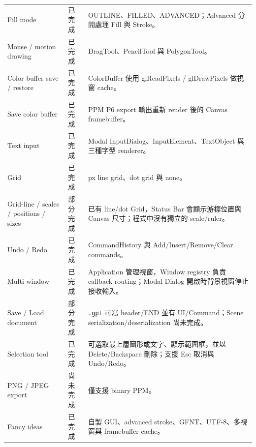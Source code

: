 \begin{longtable}{>{\raggedright\arraybackslash}p{} >{\raggedright\arraybackslash}p{} >{\raggedright\arraybackslash}p{}}
    Fill mode                              & 已完成    & OUTLINE、FILLED、ADVANCED；Advanced 分開處理 Fill 與 Stroke。                                   \\
    Mouse / motion drawing                 & 已完成    & DragTool、PencilTool 與 PolygonTool。                                                     \\
    Color buffer save / restore            & 已完成    & ColorBuffer 使用 glReadPixels / glDrawPixels 做視窗 cache。                                  \\
    Save color buffer                      & 已完成    & PPM P6 export 輸出重新 render 後的 Canvas framebuffer。                                       \\
    Text input                             & 已完成    & Modal InputDialog、InputElement、TextObject 與三種字型 renderer。                              \\
    Grid                                   & 已完成    & 25 px line grid、dot grid 與 none。                                                       \\
    Grid-line / scales / positions / sizes & 部分完成   & 已有 line/dot Grid，Status Bar 會顯示游標位置與 Canvas 尺寸；程式中沒有獨立的 scale/ruler。                   \\
    Undo / Redo                            & 已完成    & CommandHistory 與 Add/Insert/Remove/Clear commands。                                     \\
    Multi-window                           & 已完成    & Application 管理視窗，Window registry 負責 callback routing；Modal Dialog 開啟時背景視窗停止接收輸入。       \\
    Save / Load document                   & 部分完成   & \lstinline|.gpt| 可寫 header/END 並有 UI/Command；Scene serialization/deserialization 尚未完成。 \\
    Selection tool                         & 已完成    & 可選取最上層圖形或文字、顯示範圍框，並以 Delete/Backspace 刪除；支援 Esc 取消與 Undo/Redo。                  \\
    PNG / JPEG export                      & 尚未完成   & 僅支援 binary PPM。                                                                        \\
    Fancy ideas                            & 已完成    & 自製 GUI、advanced stroke、GFNT、UTF-8、多視窗與 framebuffer cache。                              \\
    \bottomrule
\end{longtable}
